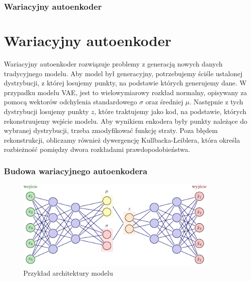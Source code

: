 \documentclass{beamer}
\begin{document}
	\begin{frame}
		\frametitle{Wariacyjny autoenkoder}
		\section{Wariacyjny autoenkoder}
		Wariacyjny autoenkoder rozwiązuje problemy z generacją nowych danych tradycyjnego modelu. Aby model był generacyjny, potrzebujemy ściśle ustalonej dystrybucji, z której losujemy punkty, na podstawie których generujemy dane. W przypadku modelu VAE, jest to wielowymiarowy rozkład normalny, opisywany za pomocą wektorów odchylenia standardowego $\sigma$ oraz średniej $\mu$. Następnie z tych dystrybucji losujemy punkty $z$, które traktujemy jako kod, na podstawie, których rekonstruujemy wejście modelu. Aby wynikiem enkodera były punkty należące do wybranej dystrybucji, trzeba zmodyfikować funkcję straty. Poza błędem rekonstrukcji, obliczamy również dywergencję Kullbacka-Leiblera, która określa rozbieżność pomiędzy dwora rozkładami prawdopodobieństwa. 
	\end{frame}

	\begin{frame}
		\frametitle{Budowa wariacyjnego autoenkodera}
		\begin{figure}
			\centering\includegraphics[width=10cm]{tikzvae.pdf}
			\caption{Przykład architektury modelu}
		\end{figure}
	\end{frame}
\end{document}
